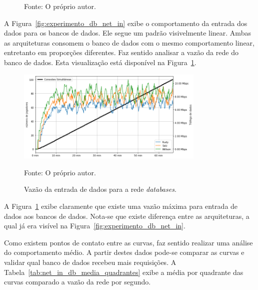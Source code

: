 \begin{figure}[htb!]
    Fonte: O próprio autor.
\end{figure}

A Figura~\ref{fig:experimento_db_net_in} exibe o comportamento da entrada dos dados para os bancos de dados.
%
Ele segue um padrão visivelmente linear.
%
Ambas as arquiteturas consomem o banco de dados com o mesmo comportamento linear, entretanto em proporções diferentes.
%
Faz sentido analisar a vazão da rede do banco de dados.
%
Esta visualização está disponível na Figura~\ref{fig:net_in_db}.

\begin{figure}[htb!]
  \caption{Vazão da entrada de dados para a rede \textit{databases}.}
  \label{fig:net_in_db}
  \includegraphics[width=0.8\textwidth]{figuras/analise/net_in_db.png}
  \centering

  Fonte: O próprio autor.
\end{figure}

A Figura~\ref{fig:net_in_db} exibe claramente que existe uma vazão máxima para entrada de dados aos bancos de dados.
%
Nota-se que existe diferença entre as arquiteturas, a qual já era visível na Figura~\ref{fig:experimento_db_net_in}.

Como existem pontos de contato entre as curvas, faz sentido realizar uma análise do comportamento médio.
%
A partir destes dados pode-se comparar as curvas e validar qual banco de dados recebeu mais requisições.
%
A Tabela~\ref{tab:net_in_db_media_quadrantes} exibe a média por quadrante das curvas comparado a vazão da rede por segundo.

